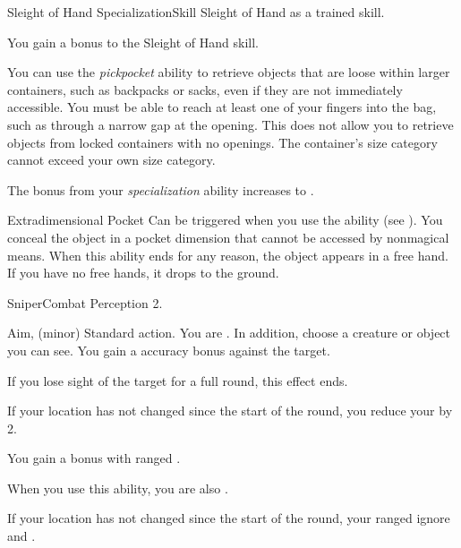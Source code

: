   \begin{feat}{Sleight of Hand Specialization}{Skill}
    \featpre Sleight of Hand as a trained skill.

     You gain a  bonus to the Sleight of Hand skill.

     You can use the \textit{pickpocket} ability to retrieve objects that are loose within larger containers, such as backpacks or sacks, even if they are not immediately accessible.
    You must be able to reach at least one of your fingers into the bag, such as through a narrow gap at the opening.
    This does not allow you to retrieve objects from locked containers with no openings.
    The container's size category cannot exceed your own size category.

     The bonus from your \textit{specialization} ability increases to .

    \begin{magicalattuneability}{Extradimensional Pocket}{}
      \abilityusagetime Can be triggered when you use the  ability (see ).
      \rankline
      You conceal the object in a pocket dimension that cannot be accessed by nonmagical means.
      When this ability ends for any reason, the object appears in a free hand.
      If you have no free hands, it drops to the ground.
    \end{magicalattuneability}
  \end{feat}

  \begin{feat}{Sniper}{Combat}
    \featpre Perception 2.

    \begin{sustainability}{Aim}{,  (minor)}
      \abilityusagetime Standard action.
      \rankline
      You are  \focused.
      In addition, choose a creature or object you can see.
      You gain a  accuracy bonus against the target.

      If you lose sight of the target for a full round, this effect ends.
    \end{sustainability}

     If your location has not changed since the start of the round, you reduce your  by 2.

     You gain a   bonus with ranged .

     When you use this ability, you are also  \honed.

     If your location has not changed since the start of the round, your ranged  ignore  and .
  \end{feat}

